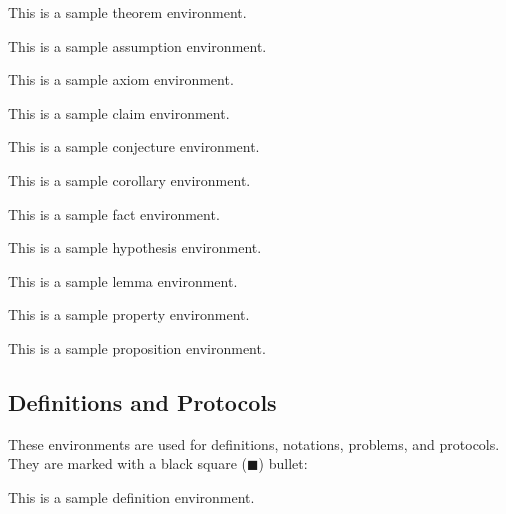 \documentclass{amsart}
\begin{document}
\begin{theorem}
	This is a sample theorem environment.
\end{theorem}

\begin{assumption}
	This is a sample assumption environment.
\end{assumption}

\begin{axiom}
	This is a sample axiom environment.
\end{axiom}

\begin{claim}
	This is a sample claim environment.
\end{claim}

\begin{conjecture}
	This is a sample conjecture environment.
\end{conjecture}

\begin{corollary}
	This is a sample corollary environment.
\end{corollary}

\begin{fact}
	This is a sample fact environment.
\end{fact}

\begin{hypothesis}
	This is a sample hypothesis environment.
\end{hypothesis}

\begin{lemma}
	This is a sample lemma environment.
\end{lemma}

\begin{property}
	This is a sample property environment.
\end{property}

\begin{proposition}
	This is a sample proposition environment.
\end{proposition}

\subsection{Definitions and Protocols}

These environments are used for definitions, notations, problems, and protocols. They are marked with a black square ($\blacksquare$) bullet:

\begin{definition}
	This is a sample definition environment.
\end{definition}
\end{document}
